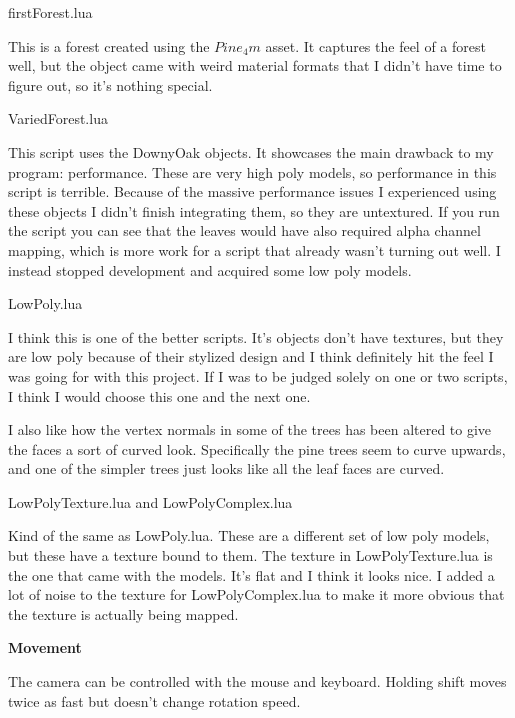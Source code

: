 \documentclass[10pt]{article}
\begin{document}
	\begin{center}
		firstForest.lua
	\end{center}
	
	This is a forest created using the $Pine_4m$ asset. It captures the feel of a forest well, but the object came with weird material formats that I didn't have time to figure out, so it's nothing special.
	
	\begin{center}
		VariedForest.lua
	\end{center}
	
	This script uses the DownyOak objects. It showcases the main drawback to my program: performance. These are very high poly models, so performance in this script is terrible. Because of the massive performance issues I experienced using these objects I didn't finish integrating them, so they are untextured. If you run the script you can see that the leaves would have also required alpha channel mapping, which is more work for a script that already wasn't turning out well. I instead stopped development and acquired some low poly models.
	
	\begin{center}
		LowPoly.lua
	\end{center}
	
	I think this is one of the better scripts. It's objects don't have textures, but they are low poly because of their stylized design and I think definitely hit the feel I was going for with this project. If I was to be judged solely on one or two scripts, I think I would choose this one and the next one.
	
	I also like how the vertex normals in some of the trees has been altered to give the faces a sort of curved look. Specifically the pine trees seem to curve upwards, and one of the simpler trees just looks like all the leaf faces are curved.
	
	\begin{center}
		LowPolyTexture.lua and LowPolyComplex.lua
	\end{center}
	
	Kind of the same as LowPoly.lua. These are a different set of low poly models, but these have a texture bound to them. The texture in LowPolyTexture.lua is the one that came with the models. It's flat and I think it looks nice. I added a lot of noise to the texture for LowPolyComplex.lua to make it more obvious that the texture is actually being mapped.
	
	\begin{center}
		\bf Movement
	\end{center}
	The camera can be controlled with the mouse and keyboard. Holding shift moves twice as fast but doesn't change rotation speed.
	
\end{document}
